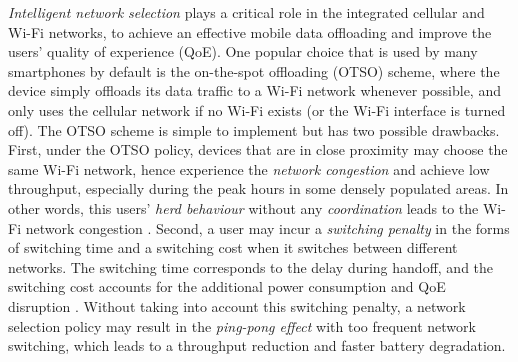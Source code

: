 \documentclass[journal]{IEEEtran}
\begin{document}
  \emph{Intelligent network selection} plays a critical role in the integrated cellular and Wi-Fi networks, to achieve an effective mobile data offloading and improve the users' quality of experience (QoE).  One popular choice that is used by many smartphones by default is the on-the-spot offloading (OTSO) scheme, where the device simply offloads its data traffic to a Wi-Fi network whenever possible, and only uses the cellular network if no Wi-Fi exists (or the Wi-Fi interface is turned off).	
	The OTSO scheme is simple to implement but has two possible drawbacks.
  First, under the OTSO policy, devices that are in close proximity may choose the same Wi-Fi network, hence experience the \emph{network congestion} and achieve low throughput, especially during the peak hours in some densely populated areas. 
	In other words, this users' \emph{herd behaviour} without any \emph{coordination} leads to the Wi-Fi network congestion \cite{paolini_tw12}. %
  Second, a user may incur a \emph{switching penalty} in the forms of switching time and a switching cost when it switches between different networks. The switching time corresponds to the delay during handoff, and the switching cost accounts for the additional power consumption and QoE disruption \cite{southwell_sm12}. 
  Without taking into account this switching penalty, a network selection policy may result in the \emph{ping-pong effect} \cite{4gamericas_io13} with too frequent network switching, which leads to a throughput reduction and faster battery degradation.
\end{document}
